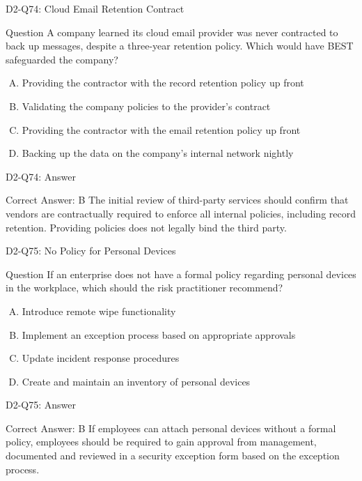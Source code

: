 \documentclass{beamer}
\begin{document}
	\begin{frame}{D2-Q74: Cloud Email Retention Contract}
		\begin{block}{Question}
			A company learned its cloud email provider was never contracted to back up messages, despite a three-year retention policy. Which would have BEST safeguarded the company?
		\end{block}
		\begin{enumerate}[(A)]
			\item Providing the contractor with the record retention policy up front
			\item Validating the company policies to the provider's contract
			\item Providing the contractor with the email retention policy up front
			\item Backing up the data on the company's internal network nightly
		\end{enumerate}
	\end{frame}
	\begin{frame}{D2-Q74: Answer}
		\begin{block}{Correct Answer: B}
			The initial review of third-party services should confirm that vendors are contractually required to enforce all internal policies, including record retention. Providing policies does not legally bind the third party.
		\end{block}
	\end{frame}
	
	\begin{frame}{D2-Q75: No Policy for Personal Devices}
		\begin{block}{Question}
			If an enterprise does not have a formal policy regarding personal devices in the workplace, which should the risk practitioner recommend?
		\end{block}
		\begin{enumerate}[(A)]
			\item Introduce remote wipe functionality
			\item Implement an exception process based on appropriate approvals
			\item Update incident response procedures
			\item Create and maintain an inventory of personal devices
		\end{enumerate}
	\end{frame}
	\begin{frame}{D2-Q75: Answer}
		\begin{block}{Correct Answer: B}
			If employees can attach personal devices without a formal policy, employees should be required to gain approval from management, documented and reviewed in a security exception form based on the exception process.
		\end{block}
	\end{frame}
	
\end{document}
